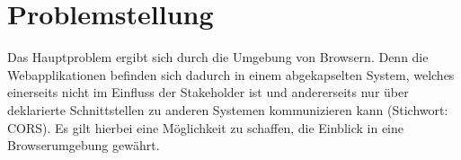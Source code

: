\section{Problemstellung}




%
%

Das Hauptproblem ergibt sich durch die Umgebung von Browsern. Denn die Webapplikationen befinden sich dadurch in einem abgekapselten System, welches einerseits nicht im Einfluss der Stakeholder ist und andererseits nur über deklarierte Schnittstellen zu anderen Systemen kommunizieren kann (Stichwort: CORS). Es gilt hierbei eine Möglichkeit zu schaffen, die Einblick in eine Browserumgebung gewährt.

